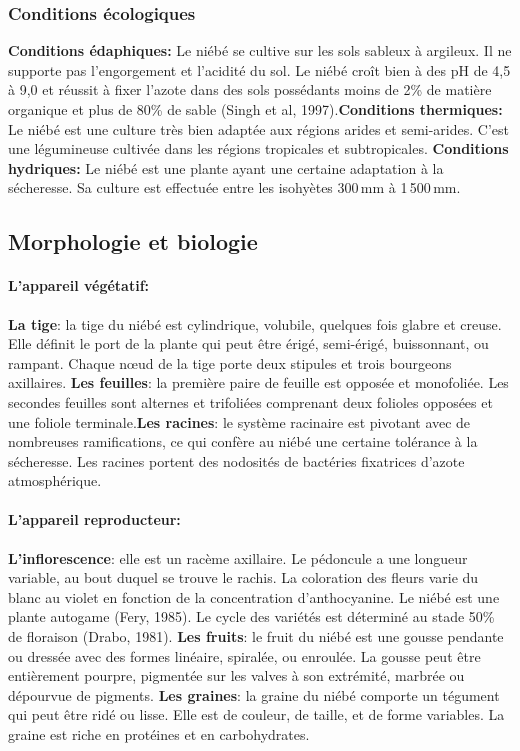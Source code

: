 \documentclass[a4paper,11pt]{article}
\begin{document}
\subsubsection{Conditions écologiques}

\textbf{Conditions édaphiques:}
Le niébé se cultive sur les sols sableux à argileux. Il ne supporte
pas l’engorgement et l’acidité du sol. Le niébé croît bien à des pH de
4,5 à 9,0 et réussit à fixer l’azote dans des sols possédants moins de
2\% de matière organique et plus de 80\% de sable (Singh et al,
1997)\cite{Doggett_1988}.\textbf{Conditions thermiques:}
Le niébé est une culture très bien adaptée aux régions arides et
semi-arides. C’est une légumineuse cultivée dans les régions
tropicales et subtropicales\cite{Doggett_1988}.
\textbf{Conditions hydriques:} Le niébé est une plante ayant une certaine adaptation à la
sécheresse. Sa culture est effectuée entre les isohyètes 300\,mm à
1\,500\,mm\cite{Doggett_1988}.

\subsection{Morphologie et biologie}

  
\paragraph{L’appareil végétatif:}

\textbf{La tige}: la tige du niébé est cylindrique, volubile, quelques fois
glabre et creuse. Elle définit le port de la plante qui peut être
érigé, semi-érigé, buissonnant, ou rampant. Chaque nœud de la tige
porte deux stipules et trois bourgeons axillaires. \textbf{Les feuilles}: la
première paire de feuille est opposée et monofoliée. Les secondes
feuilles sont alternes et trifoliées comprenant deux folioles opposées
et une foliole terminale.\textbf{Les racines}: le système racinaire est
pivotant avec de nombreuses ramifications, ce qui confère au niébé une
certaine tolérance à la sécheresse. Les racines portent des nodosités
de bactéries fixatrices d’azote atmosphérique\cite{Doggett_1988}.

\paragraph{L’appareil reproducteur:}

\textbf{L’inflorescence}: elle est un racème axillaire. Le pédoncule a une
longueur variable, au bout duquel se trouve le rachis. La coloration
des fleurs varie du blanc au violet en fonction de la concentration
d’anthocyanine. Le niébé est une plante autogame (Fery, 1985). Le cycle des
variétés est déterminé au stade 50\% de floraison (Drabo,
1981). \textbf{Les fruits}: le fruit du niébé est une gousse pendante ou
dressée avec des formes linéaire, spiralée, ou enroulée. La gousse
peut être entièrement pourpre, pigmentée sur les valves à son
extrémité, marbrée ou dépourvue de pigments. \textbf{Les graines}: la graine
du niébé comporte un tégument qui peut être ridé ou lisse. Elle est de
couleur, de taille, et de forme variables. La graine est riche en
protéines et en carbohydrates\cite{Doggett_1988}.
\end{document}
